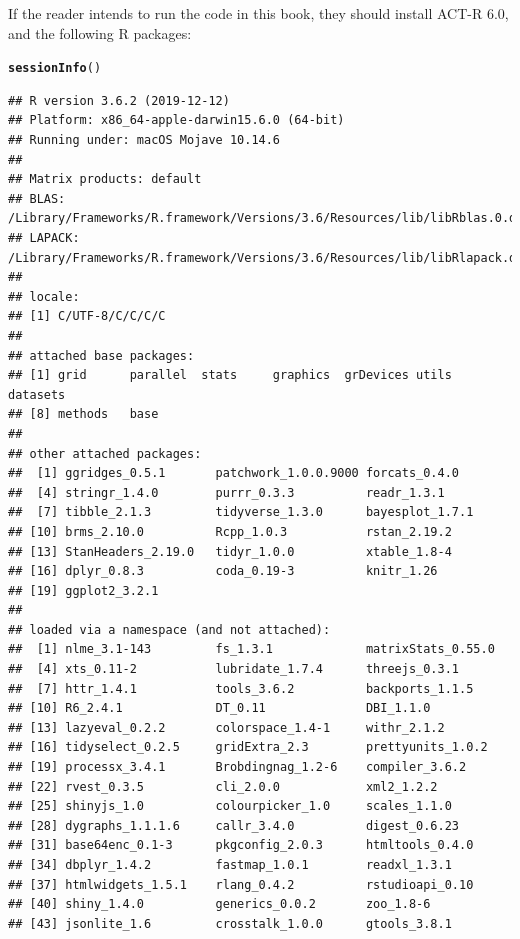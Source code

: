 \documentclass{cambridge7A}\usepackage[]{graphicx}\usepackage[]{color}
\makeatletter
\newcommand{\hlstd}[1]{\textcolor[rgb]{0.345,0.345,0.345}{#1}}%
\newcommand{\hlkwd}[1]{\textcolor[rgb]{0.737,0.353,0.396}{\textbf{#1}}}%
\newenvironment{kframe}{%
 \def\at@end@of@kframe{}%
 \ifinner\ifhmode%
  \def\at@end@of@kframe{\end{minipage}}%
  \begin{minipage}{\columnwidth}%
 \fi\fi%
 \def\FrameCommand##1{\hskip\@totalleftmargin \hskip-\fboxsep
 \colorbox{shadecolor}{##1}\hskip-\fboxsep
     \hskip-\linewidth \hskip-\@totalleftmargin \hskip\columnwidth}%
 \MakeFramed {\advance\hsize-\width
   \@totalleftmargin\z@ \linewidth\hsize
   \@setminipage}}%
 {\par\unskip\endMakeFramed%
 \at@end@of@kframe}
\newenvironment{knitrout}{}{} %
\makeatother
\begin{document}
If the reader intends to run the code in this book, they should install ACT-R 6.0, and the following R packages:

\begin{knitrout}
\color{fgcolor}\begin{kframe}
\begin{alltt}
\hlkwd{sessionInfo}\hlstd{()}
\end{alltt}
\begin{verbatim}
## R version 3.6.2 (2019-12-12)
## Platform: x86_64-apple-darwin15.6.0 (64-bit)
## Running under: macOS Mojave 10.14.6
## 
## Matrix products: default
## BLAS:   /Library/Frameworks/R.framework/Versions/3.6/Resources/lib/libRblas.0.dylib
## LAPACK: /Library/Frameworks/R.framework/Versions/3.6/Resources/lib/libRlapack.dylib
## 
## locale:
## [1] C/UTF-8/C/C/C/C
## 
## attached base packages:
## [1] grid      parallel  stats     graphics  grDevices utils     datasets 
## [8] methods   base     
## 
## other attached packages:
##  [1] ggridges_0.5.1       patchwork_1.0.0.9000 forcats_0.4.0       
##  [4] stringr_1.4.0        purrr_0.3.3          readr_1.3.1         
##  [7] tibble_2.1.3         tidyverse_1.3.0      bayesplot_1.7.1     
## [10] brms_2.10.0          Rcpp_1.0.3           rstan_2.19.2        
## [13] StanHeaders_2.19.0   tidyr_1.0.0          xtable_1.8-4        
## [16] dplyr_0.8.3          coda_0.19-3          knitr_1.26          
## [19] ggplot2_3.2.1       
## 
## loaded via a namespace (and not attached):
##  [1] nlme_3.1-143         fs_1.3.1             matrixStats_0.55.0  
##  [4] xts_0.11-2           lubridate_1.7.4      threejs_0.3.1       
##  [7] httr_1.4.1           tools_3.6.2          backports_1.1.5     
## [10] R6_2.4.1             DT_0.11              DBI_1.1.0           
## [13] lazyeval_0.2.2       colorspace_1.4-1     withr_2.1.2         
## [16] tidyselect_0.2.5     gridExtra_2.3        prettyunits_1.0.2   
## [19] processx_3.4.1       Brobdingnag_1.2-6    compiler_3.6.2      
## [22] rvest_0.3.5          cli_2.0.0            xml2_1.2.2          
## [25] shinyjs_1.0          colourpicker_1.0     scales_1.1.0        
## [28] dygraphs_1.1.1.6     callr_3.4.0          digest_0.6.23       
## [31] base64enc_0.1-3      pkgconfig_2.0.3      htmltools_0.4.0     
## [34] dbplyr_1.4.2         fastmap_1.0.1        readxl_1.3.1        
## [37] htmlwidgets_1.5.1    rlang_0.4.2          rstudioapi_0.10     
## [40] shiny_1.4.0          generics_0.0.2       zoo_1.8-6           
## [43] jsonlite_1.6         crosstalk_1.0.0      gtools_3.8.1        

\end{verbatim}
\end{kframe}
\end{knitrout}
\end{document}
